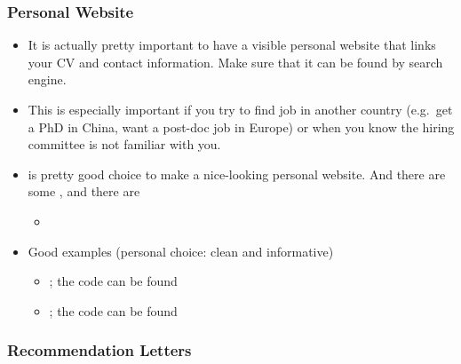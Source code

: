 \documentclass[letterpaper,10pt,english]{sphinxmanual}
\begin{document}
\subsubsection{Personal Website}
\label{\detokenize{resource/research/job_and_career:personal-website}}\begin{itemize}
\item {} 
It is actually pretty important to have a visible personal website
that links your CV and contact information. Make sure that it can be
found by search engine.

\item {} 
This is especially important if you try to find job in another
country (e.g. get a PhD in China, want a post-doc job in Europe) or
when you know the hiring committee is not familiar with you.

\item {} 
 is pretty good choice to
make a nice-looking personal website. And there are some , and there
are 
\begin{itemize}
\item {} 

\end{itemize}

\item {} 
Good examples (personal choice: clean and informative)
\begin{itemize}
\item {} 
; the code can be found

\item {} 
; the code can be found

\end{itemize}

\end{itemize}


\subsubsection{Recommendation Letters}
\label{\detokenize{resource/research/job_and_career:recommendation-letters}}
\end{document}

